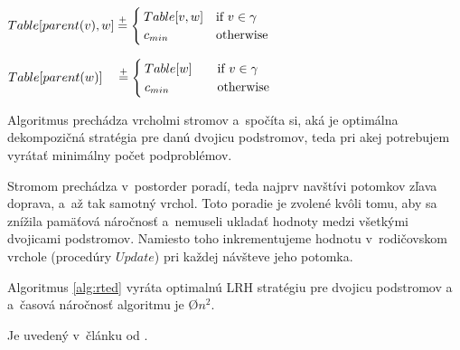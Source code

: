 \begin{algorithm}
\begin{algorithmic}[1]
  \item[]

      \State $Table[parent(v), w] \stackrel{+}{=}
        \begin{cases}
          Table[v, w] & \text{if $v \in \gamma$}
          \\
          c_{min} & \text{otherwise}
        \end{cases}$
    \EndProcedure

      \State $Table[parent(w)] \quad \stackrel{+}{=}
        \begin{cases}
          Table[w] & \quad \text{if $v \in \gamma$}
          \\
          c_{min} & \quad \text{otherwise}
        \end{cases}$
    \EndProcedure
  \end{algorithmic}
\end{algorithm}

Algoritmus prechádza vrcholmi stromov a~spočíta si, aká je optimálna dekompozičná stratégia
pre danú dvojicu podstromov, teda pri akej potrebujem vyrátať minimálny počet podproblémov.

Stromom prechádza v~postorder poradí, teda najprv navštívi potomkov zľava doprava, a~až tak
samotný vrchol.
Toto poradie je zvolené kvôli tomu, aby sa znížila pamäťová náročnosť a~nemuseli ukladať hodnoty
medzi všetkými dvojicami podstromov. Namiesto toho inkrementujeme hodnotu v~rodičovskom vrchole
(procedúry $Update$) pri každej návšteve jeho potomka.

\begin{lemma}
  Algoritmus \ref{alg:rted} vyráta optimalnú LRH stratégiu pre dvojicu podstromov  a~
  a~časová náročnosť algoritmu je \O{$n^2$}.
\end{lemma}

\begin{dukaz}
  Je uvedený v~článku od \citet{RTED}.
\end{dukaz}

